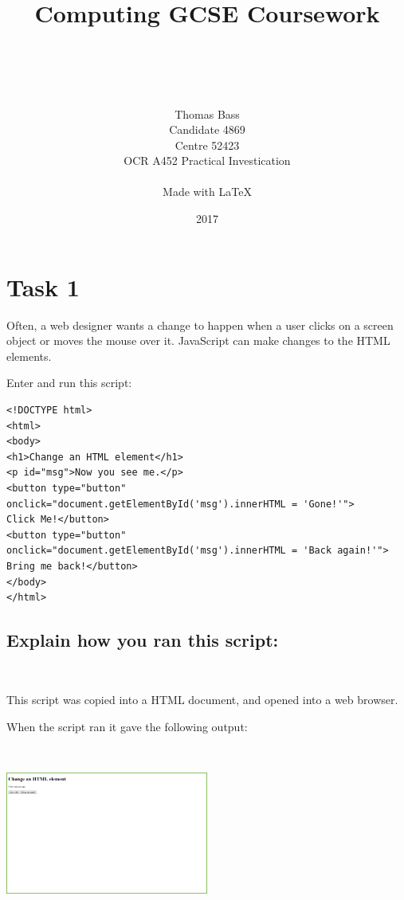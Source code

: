 \documentclass[a4paper]{article}
\title{Computing GCSE Coursework}
\author{\\ \\ \\ \\ Thomas Bass\\Candidate 4869\\Centre 52423\\OCR A452 Practical Investication\\\\Made with \LaTeX}
\date{2017}
\begin{document}
\maketitle
\pagebreak
\renewcommand*\contentsname{Summary}
\tableofcontents
\pagebreak


\section{Task 1}
Often, a web designer wants a change to happen when a user clicks on a screen object or moves the mouse over it. JavaScript can make changes to the HTML elements. \par
\noindent Enter and run this script: \par \par
\begin{lstlisting}
<!DOCTYPE html>
<html>
<body>
<h1>Change an HTML element</h1>
<p id="msg">Now you see me.</p>
<button type="button"
onclick="document.getElementById('msg').innerHTML = 'Gone!'">
Click Me!</button>
<button type="button"
onclick="document.getElementById('msg').innerHTML = 'Back again!'">
Bring me back!</button>
</body>
</html>
\end{lstlisting}
	

\subsection{Explain how you ran this script:} ~\par	

This script was copied into a HTML document, and opened into a web browser. 

When the script ran it gave the following output: ~\par ~\par
\noindent\includegraphics[width=0.5\textwidth, left, width=\linewidth, frame]{Picture1.png}
\end{document}
